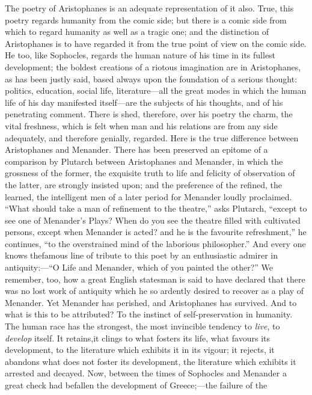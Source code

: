The poetry of Aristophanes is an adequate representation of it also.
True, this poetry regards humanity from the comic side; but there is a
comic side from which to regard humanity as well as a tragic one; and
the distinction of Aristophanes is to have regarded it from the true
point of view on the comic side. He too, like Sophocles, regards the
human nature of his time in its fullest development; the boldest
creations of a riotous imagination are in Aristophanes, as has been
justly said, based always upon the foundation of a serious thought:
politics, education, social life, literature---all the great modes in
which the human life of his day manifested itself---are the subjects of
his thoughts, and of his penetrating comment. There is shed, therefore,
over his poetry the charm, the vital freshness, which is felt when man
and his relations are from any side adequately, and therefore genially,
regarded. Here is the true difference between Aristophanes and Menander.
There has been preserved an epitome of a comparison by Plutarch between
Aristophanes and Menander, in which the grossness of the former, the
exquisite truth to life and felicity of observation of the latter, are
strongly insisted upon; and the preference of the refined, the learned,
the intelligent men of a later period for Menander loudly proclaimed.
``What should take a man of refinement to the theatre,'' asks Plutarch,
``except to see one of Menander's Plays? When do you see the theatre
filled with cultivated persons, except when Menander is acted? and he is
the favourite refreshment,'' he continues, ``to the overstrained mind of
the laborious philosopher.'' And every one knows thefamous line of
tribute to this poet by an enthusiastic admirer in antiquity:---``O Life
and Menander, which of you painted the other?'' We remember, too, how a
great English statesman is said to have declared that there was no lost
work of antiquity which he so ardently desired to recover as a play of
Menander. Yet Menander has perished, and Aristophanes has survived. And
to what is this to be attributed? To the instinct of self-preservation
in humanity. The human race has the strongest, the most invincible
tendency to \emph{live}, to \emph{develop} itself. It retains,it clings
to what fosters its life, what favours its development, to the
literature which exhibits it in its vigour; it rejects, it abandons what
does not foster its development, the literature which exhibits it
arrested and decayed. Now, between the times of Sophocles and Menander a
great check had befallen the development of Greece;---the failure of the
